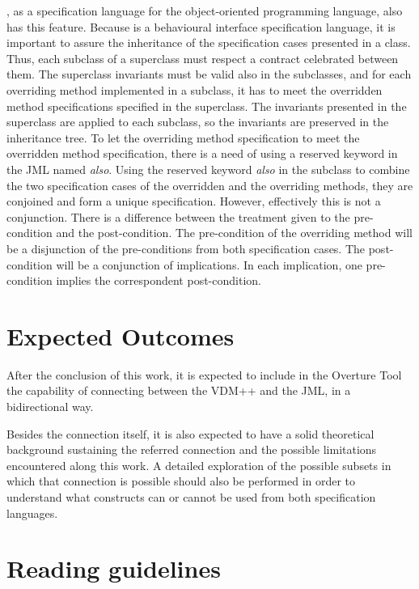 \jml, as a specification language for the \java object-oriented programming language, also has this feature. Because \jml 
is a behavioural interface specification language, it is important to assure the inheritance of the specification cases 
presented in a class. 
Thus, each subclass of a superclass must respect a contract celebrated between them.
The superclass invariants must be valid also in the subclasses, and for each overriding method implemented in a subclass, 
it has to meet the overridden method specifications specified in the superclass.
The invariants presented in the superclass are applied to each subclass, so the invariants are preserved in the inheritance tree.
To let the overriding method specification to meet the overridden method specification, there is a need of using a reserved 
keyword in the JML named \textit{also}. Using the reserved keyword \textit{also} in the subclass to combine the two specification cases of the 
overridden and the overriding methods, they are conjoined and form a unique specification.
However, effectively this is not a conjunction. There is a difference between the treatment given to the pre-condition and the post-condition.
The pre-condition of the overriding method will be a disjunction of the pre-conditions from both specification cases.
The post-condition will be a conjunction of implications. In each implication, one pre-condition implies the correspondent post-condition.


\section{Expected Outcomes}
\label{sec:chapter1:outcomes}

After the conclusion of this work, it is expected to include in the Overture Tool the capability of 
connecting between the VDM++ and the JML, in a bidirectional way.

Besides the connection itself, it is also expected to have a solid theoretical background sustaining the referred connection and the possible limitations encountered along this work.  
A detailed exploration of the possible subsets in which that connection is possible should also be performed in order to understand what constructs can or cannot be used from both specification languages.

\section{Reading guidelines}
\label{sec:chapter1:readguide}

